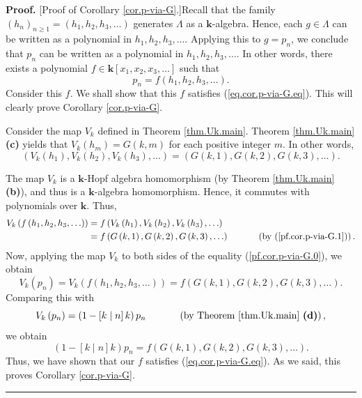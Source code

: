 \documentclass[numbers=enddot,12pt,final,onecolumn,notitlepage]{scrartcl}%
\theoremstyle{definition}
\newenvironment{proof}[1][Proof]{\noindent\textbf{#1.} }{\ \rule{0.5em}{0.5em}}
\begin{document}
\begin{proof}
[Proof of Corollary \ref{cor.p-via-G}.]Recall that the family $\left(
h_{n}\right)  _{n\geq1}=\left(  h_{1},h_{2},h_{3},\ldots\right)  $ generates
$\Lambda$ as a $\mathbf{k}$-algebra. Hence, each $g\in\Lambda$ can be written
as a polynomial in $h_{1},h_{2},h_{3},\ldots$. Applying this to $g=p_{n}$, we
conclude that $p_{n}$ can be written as a polynomial in $h_{1},h_{2}%
,h_{3},\ldots$. In other words, there exists a polynomial $f\in\mathbf{k}%
\left[  x_{1},x_{2},x_{3},\ldots\right]  $ such that%
\begin{equation}
p_{n}=f\left(  h_{1},h_{2},h_{3},\ldots\right)  . \label{pf.cor.p-via-G.0}%
\end{equation}
Consider this $f$. We shall show that this $f$ satisfies
(\ref{eq.cor.p-via-G.eq}). This will clearly prove Corollary \ref{cor.p-via-G}.

Consider the map $V_{k}$ defined in Theorem \ref{thm.Uk.main}. Theorem
\ref{thm.Uk.main} \textbf{(c)} yields that $V_{k}\left(  h_{m}\right)
=G\left(  k,m\right)  $ for each positive integer $m$. In other words,%
\begin{equation}
\left(  V_{k}\left(  h_{1}\right)  ,V_{k}\left(  h_{2}\right)  ,V_{k}\left(
h_{3}\right)  ,\ldots\right)  =\left(  G\left(  k,1\right)  ,G\left(
k,2\right)  ,G\left(  k,3\right)  ,\ldots\right)  . \label{pf.cor.p-via-G.1}%
\end{equation}


The map $V_{k}$ is a $\mathbf{k}$-Hopf algebra homomorphism (by Theorem
\ref{thm.Uk.main} \textbf{(b)}), and thus is a $\mathbf{k}$-algebra
homomorphism. Hence, it commutes with polynomials over $\mathbf{k}$. Thus,%
\begin{align*}
V_{k}\left(  f\left(  h_{1},h_{2},h_{3},\ldots\right)  \right)   &  =f\left(
V_{k}\left(  h_{1}\right)  ,V_{k}\left(  h_{2}\right)  ,V_{k}\left(
h_{3}\right)  ,\ldots\right) \\
&  =f\left(  G\left(  k,1\right)  ,G\left(  k,2\right)  ,G\left(  k,3\right)
,\ldots\right)  \ \ \ \ \ \ \ \ \ \ \left(  \text{by (\ref{pf.cor.p-via-G.1}%
)}\right)  .
\end{align*}
Now, applying the map $V_{k}$ to both sides of the equality
(\ref{pf.cor.p-via-G.0}), we obtain%
\[
V_{k}\left(  p_{n}\right)  =V_{k}\left(  f\left(  h_{1},h_{2},h_{3}%
,\ldots\right)  \right)  =f\left(  G\left(  k,1\right)  ,G\left(  k,2\right)
,G\left(  k,3\right)  ,\ldots\right)  .
\]
Comparing this with%
\[
V_{k}\left(  p_{n}\right)  =\left(  1-\left[  k\mid n\right]  k\right)
p_{n}\ \ \ \ \ \ \ \ \ \ \left(  \text{by Theorem \ref{thm.Uk.main}
\textbf{(d)}}\right)  ,
\]
we obtain%
\[
\left(  1-\left[  k\mid n\right]  k\right)  p_{n}=f\left(  G\left(
k,1\right)  ,G\left(  k,2\right)  ,G\left(  k,3\right)  ,\ldots\right)  .
\]
Thus, we have shown that our $f$ satisfies (\ref{eq.cor.p-via-G.eq}). As we
said, this proves Corollary \ref{cor.p-via-G}.
\end{proof}
\end{document}
